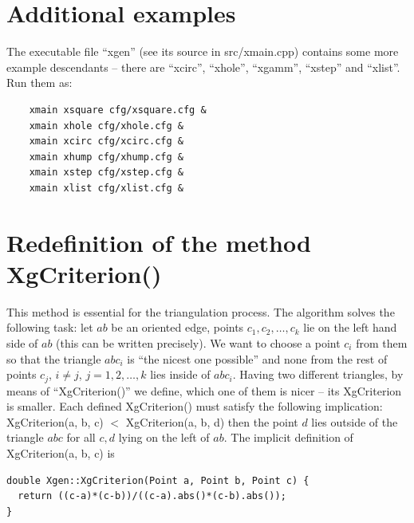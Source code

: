 \documentclass[12pt]{article}
\begin{document}
  \section{Additional examples}

  The executable file ``xgen'' (see its source in src/xmain.cpp) contains
  some more example descendants -- there are ``xcirc'', ``xhole'', ``xgamm'', 
  ``xstep'' and ``xlist''. Run them as:
  \begin{verbatim}
    xmain xsquare cfg/xsquare.cfg &
    xmain xhole cfg/xhole.cfg &
    xmain xcirc cfg/xcirc.cfg &
    xmain xhump cfg/xhump.cfg &
    xmain xstep cfg/xstep.cfg &
    xmain xlist cfg/xlist.cfg &
  \end{verbatim}

  \section{Redefinition of the method XgCriterion()}

  This method is essential for the triangulation process. The algorithm solves
  the following task: let $ab$ be an oriented edge, points $c_1, c_2, \ldots, c_k$ lie on the left
  hand side of $ab$ (this can be written precisely). We want to choose a point $c_i$ from them
  so that the triangle
  $abc_i$ is ``the nicest one possible'' and none from the rest of points $c_j$, 
  $ i \not= j$, $j = 1, 2, \ldots, k$ lies inside of $abc_i$. Having two different
  triangles, by means of ``XgCriterion()'' we define, which one of them is nicer -- its XgCriterion
  is smaller. Each defined XgCriterion() must satisfy the following implication:
  XgCriterion(a, b, c) $<$ 
  XgCriterion(a, b, d) then the point $d$ lies outside of the triangle $abc$ for all $c, d$ lying
  on the left of $ab$.
  The implicit definition of XgCriterion(a, b, c) is

  \begin{verbatim}
double Xgen::XgCriterion(Point a, Point b, Point c) {
  return ((c-a)*(c-b))/((c-a).abs()*(c-b).abs());
}
  \end{verbatim}
\end{document}
